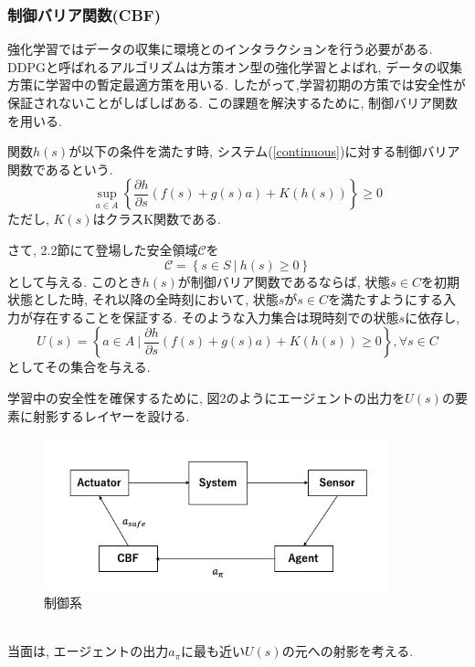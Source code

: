 \documentclass{jsarticle}
\newcommand{\pdif}[2]{\frac{\partial#1}{\partial#2}}
\begin{document}
\subsubsection{制御バリア関数(CBF)}
強化学習ではデータの収集に環境とのインタラクションを行う必要がある. DDPGと呼ばれるアルゴリズムは方策オン型の強化学習とよばれ, データの収集方策に学習中の暫定最適方策を用いる. したがって,学習初期の方策では安全性が保証されないことがしばしばある. この課題を解決するために, 制御バリア関数を用いる. \par
関数$h(s)$が以下の条件を満たす時, システム(\ref{continuous})に対する制御バリア関数であるという. 
\begin{equation}
	\sup_{a\in A}\left\{\pdif{h}{s}(f(s)+g(s)a)+K(h(s))\right\} \geq 0 \label{CBF}
\end{equation}
ただし, $K(s)$はクラスK関数である.\par
さて, 2.2節にて登場した安全領域$\mathcal{C}$を
\begin{equation}
	\mathcal{C} = \left\{s \in S~|~h(s)\geq 0\right\}
\end{equation}
として与える. このとき$h(s)$が制御バリア関数であるならば, 状態$s\in C$を初期状態とした時, それ以降の全時刻において, 状態$s$が$s\in C$を満たすようにする入力が存在することを保証する. そのような入力集合は現時刻での状態$s$に依存し,
\begin{equation}
	U(s) = \left\{a \in A~|~\pdif{h}{s}(f(s)+g(s)a)+K(h(s))\geq 0\right\}, \forall s\in C
\end{equation}
としてその集合を与える.\par
学習中の安全性を確保するために, 図2のようにエージェントの出力を$U(s)$の要素に射影するレイヤーを設ける.
\begin{figure}[h]
	\centering
 	\includegraphics[width=10cm]{barrier_certificate.png}
 	\caption{制御系} \label{cbf}
\end{figure}\\
当面は, エージェントの出力$a_{\pi}$に最も近い$U(s)$の元への射影を考える.
\end{document}
